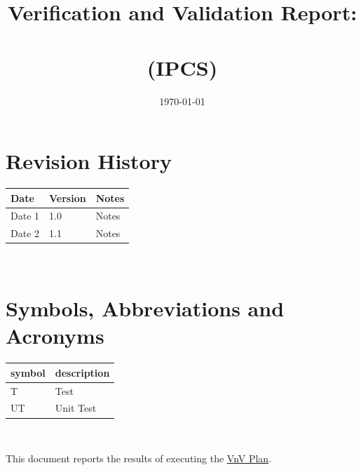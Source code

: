\documentclass[12pt, titlepage]{article}
\begin{document}
\title{Verification and Validation Report:\\ \progname \\ (IPCS)} 
\author{\authname}
\date{\today}
	
\maketitle


\section{Revision History}

\begin{tabularx}{\textwidth}{p{3cm}p{2cm}X}
\toprule {\bf Date} & {\bf Version} & {\bf Notes}\\
\midrule
Date 1 & 1.0 & Notes\\
Date 2 & 1.1 & Notes\\
\bottomrule
\end{tabularx}

~\newpage

\section{Symbols, Abbreviations and Acronyms}

\renewcommand{\arraystretch}{1.2}
\begin{tabular}{l l} 
  \toprule		
  \textbf{symbol} & \textbf{description} \\
  \midrule 
  T               & Test                 \\
  UT              & Unit Test            \\
  \bottomrule
\end{tabular}\\


\newpage

\tableofcontents

\listoftables %

\listoffigures %

\newpage


This document reports the results of executing the
\href{https://github.com/mirzaim/ipcs/blob/main/docs/VnVPlan/VnVPlan.pdf}{VnV Plan}.
\end{document}
